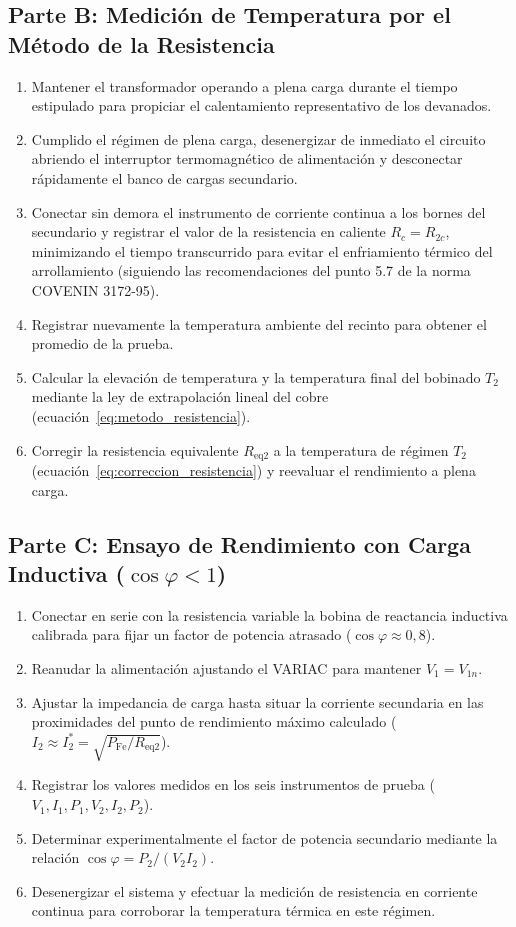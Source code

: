 \subsection{Parte B: Medición de Temperatura por el Método de la Resistencia}
\begin{enumerate}
    \item Mantener el transformador operando a plena carga durante el tiempo estipulado para propiciar el calentamiento representativo de los devanados.
    \item Cumplido el régimen de plena carga, desenergizar de inmediato el circuito abriendo el interruptor termomagnético de alimentación y desconectar rápidamente el banco de cargas secundario.
    \item Conectar sin demora el instrumento de corriente continua a los bornes del secundario y registrar el valor de la resistencia en caliente $R_c = R_{2c}$, minimizando el tiempo transcurrido para evitar el enfriamiento térmico del arrollamiento (siguiendo las recomendaciones del punto 5.7 de la norma COVENIN 3172-95).
    \item Registrar nuevamente la temperatura ambiente del recinto para obtener el promedio de la prueba.
    \item Calcular la elevación de temperatura y la temperatura final del bobinado $T_2$ mediante la ley de extrapolación lineal del cobre (ecuación~\eqref{eq:metodo_resistencia}).
    \item Corregir la resistencia equivalente $R_{\text{eq2}}$ a la temperatura de régimen $T_2$ (ecuación~\eqref{eq:correccion_resistencia}) y reevaluar el rendimiento a plena carga.
\end{enumerate}

\subsection{Parte C: Ensayo de Rendimiento con Carga Inductiva (\texorpdfstring{$\cos\varphi < 1$}{cos phi < 1})}
\begin{enumerate}
    \item Conectar en serie con la resistencia variable la bobina de reactancia inductiva calibrada para fijar un factor de potencia atrasado ($\cos\varphi \approx 0{,}8$).
    \item Reanudar la alimentación ajustando el VARIAC para mantener $V_1 = V_{1n}$.
    \item Ajustar la impedancia de carga hasta situar la corriente secundaria en las proximidades del punto de rendimiento máximo calculado ($I_2 \approx I_2^* = \sqrt{P_{\text{Fe}}/R_{\text{eq2}}}$).
    \item Registrar los valores medidos en los seis instrumentos de prueba ($V_1, I_1, P_1, V_2, I_2, P_2$).
    \item Determinar experimentalmente el factor de potencia secundario mediante la relación $\cos\varphi = P_2 / (V_2 I_2)$.
    \item Desenergizar el sistema y efectuar la medición de resistencia en corriente continua para corroborar la temperatura térmica en este régimen.
\end{enumerate}
